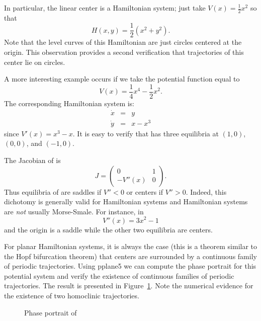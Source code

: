 \documentclass{ximera}
\begin{document}
In particular, the linear center is a 
Hamiltonian system; just take 
$V(x)=\frac{1}{2}x^2$ so that 
\[
H(x,y) = \frac{1}{2}(x^2+y^2).
\]
Note that the level curves of this Hamiltonian are just circles centered 
at the origin.  This observation provides a second verification that 
trajectories of this center lie on circles.

A more interesting example occurs if we take the potential function 
equal to 
\[
V(x) = \frac{1}{4}x^4 - \frac{1}{2}x^2.
\]
The corresponding Hamiltonian system is:
\begin{equation*}  \label{e:hamex1}
\begin{array}{rcl} 
\dot{x} & = & y \\
\dot{y} & = & x-x^3 
\end{array}
\end{equation*}%
since $V'(x)=x^3-x$.  It is easy to verify that  has three 
equilibria at $(1,0)$, $(0,0)$, and $(-1,0)$.  

The Jacobian of  is
\[
J = \left(\begin{array}{cc}  0 & 1 \\ -V''(x) & 0 \end{array}\right).
\]
Thus equilibria of  are saddles 
if $V''<0$ or centers if $V''>0$.
Indeed, this dichotomy is generally valid for Hamiltonian systems and 
Hamiltonian systems are {\em not\/} usually Morse-Smale.  For instance, in
\[
V''(x) = 3x^2-1
\]
and the origin is a saddle while the other two equilibria are centers. 

For planar Hamiltonian systems, it is always the case (this is a theorem
similar to the Hopf bifurcation theorem) that centers are surrounded by 
a continuous family of periodic 
trajectories.  Using 
{\sf pplane5} we can
compute the phase portrait for 
this potential system and verify the 
existence of continuous families of periodic trajectories.  The result 
is presented in Figure~\ref{F:hamex}.  Note the numerical evidence for 
the existence of two homoclinic trajectories.  
\begin{figure}[htb]
           \centerline{%
	   }
           \caption{Phase portrait of \protect{}}
           \label{F:hamex}
\end{figure}
\end{document}
